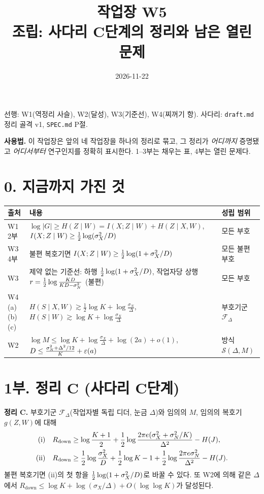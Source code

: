 
\title{\sffamily 작업장 W5\\[2pt]\large 조립: 사다리 C단계의 정리와 남은 열린 문제}
\author{}
\date{2026-11-22}

\maketitle
\vspace{-2.5em}
\begin{center}\small
선행: W1(역정리 사슬), W2(달성), W3(기준선), W4(찌꺼기 항). 사다리: \texttt{draft.md} 정리 골격 v1, \texttt{SPEC.md} P절.
\end{center}

\textbf{사용법.} 이 작업장은 앞의 네 작업장을 하나의 정리로 묶고, 그 정리가 \emph{어디까지} 증명됐고 \emph{어디서부터} 연구인지를 정확히 표시한다. 1–3부는 채우는 표, 4부는 열린 문제다.

\section*{0. 지금까지 가진 것}
\begin{center}\small
\renewcommand{\arraystretch}{1.3}
\begin{tabularx}{\linewidth}{@{}lYl@{}}
\toprule
출처 & 내용 & 성립 범위\\ \midrule
W1 2부 & $\log|G|\ge H(Z\mid W)=I(X;Z\mid W)+H(Z\mid X,W)$, \ $I(X;Z\mid W)\ge\frac12\log(\sigma_X^2/D)$ & 모든 부호\\
W3 4부 & 불편 복호기면 $I(X;Z\mid W)\ge\frac12\log(1+\sigma_X^2/D)$ & 모든 불편 부호\\
W3 & 제약 없는 기준선: 하행 $\frac12\log(1+\sigma_X^2/D)$, 작업자당 상행 $r=\frac12\log\frac{KD}{KD-\sigma_N^2}$ (불편) & 모든 부호\\
W4 (a)(b)(c) & $H(S\mid X,W)\gtrsim\frac12\log K+\log\frac{\sigma_N}\Delta$, \ $H(S\mid W)\gtrsim\log K+\log\frac{\sigma_X}\Delta$ & 부호기군 $\mathcal F_\Delta$\\
W2 & $\log M\le\log K+\log\frac{\sigma_X}\Delta+\log(2a)+o(1)$, \ $D\le\frac{\sigma_N^2+\Delta^2/12}K+\varepsilon(a)$ & 방식 $\mathcal S(\Delta,M)$\\
\bottomrule
\end{tabularx}
\end{center}

\section*{1부. 정리 C (사다리 C단계)}
\begin{thmbox}
\textbf{정리 C.} 부호기군 $\mathcal F_\Delta$(작업자별 독립 디더, 눈금 $\Delta$)와 임의의 $M$, 임의의 복호기 $g(Z,W)$에 대해
\begin{align*}
\text{(i)}\quad R_{\mathrm{down}}&\ge\log\frac{K+1}2+\frac12\log\frac{2\pi e(\sigma_X^2+\sigma_N^2/K)}{\Delta^2}-H(J),\\
\text{(ii)}\quad R_{\mathrm{down}}&\ge\frac12\log\frac{\sigma_X^2}D+\frac12\log K-1+\frac12\log\frac{2\pi e\sigma_N^2}{\Delta^2}-H(J).
\end{align*}
불편 복호기면 (ii)의 첫 항을 $\frac12\log(1+\sigma_X^2/D)$로 바꿀 수 있다. 또 W2에 의해 같은 $\Delta$에서 $R_{\mathrm{down}}\le\log K+\log(\sigma_X/\Delta)+O(\log\log K)$가 달성된다.
\end{thmbox}


